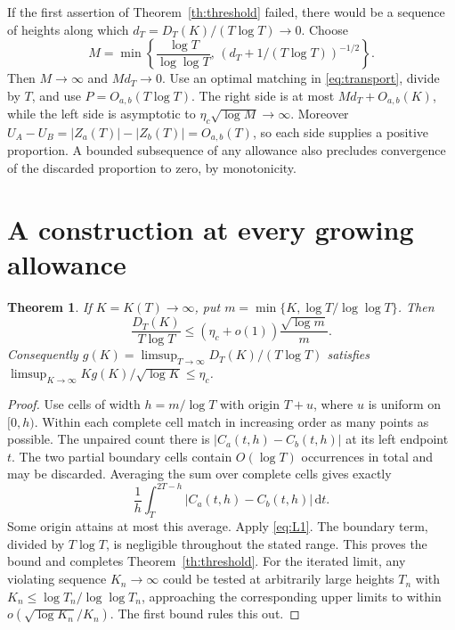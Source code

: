 \documentclass[11pt]{article}
\newtheorem{theorem}{Theorem}[section]
\newcommand{\dd}{\,\mathrm d}
\begin{document}
If the first assertion of Theorem~\ref{th:threshold} failed, there would be a
sequence of heights along which \(d_T=D_T(K)/(T\log T)\to0\).
Choose
\[
 M=\min\left\{\frac{\log T}{\log\log T},\,
                  (d_T+1/(T\log T))^{-1/2}\right\}.
\]
Then \(M\to\infty\) and \(Md_T\to0\). Use an optimal matching in
\eqref{eq:transport}, divide by \(T\), and use \(P=O_{a,b}(T\log T)\).
The right side is at most \(Md_T+O_{a,b}(K)\), while the left side is
asymptotic to \(\eta_c\sqrt{\log M}\to\infty\). Moreover
\(U_A-U_B=|Z_a(T)|-|Z_b(T)|=O_{a,b}(T)\), so each side supplies a positive
proportion. A bounded subsequence of any allowance also precludes convergence
of the discarded proportion to zero, by monotonicity.

\section{A construction at every growing allowance}

\begin{theorem}\label{th:upper}
If \(K=K(T)\to\infty\), put
\(m=\min\{K,\log T/\log\log T\}\). Then
\[
 \frac{D_T(K)}{T\log T}
 \le (\eta_c+o(1))\frac{\sqrt{\log m}}{m}.
\]
Consequently \(g(K)=\limsup_{T\to\infty}D_T(K)/(T\log T)\) satisfies
\(\limsup_{K\to\infty}K g(K)/\sqrt{\log K}\le\eta_c\).
\end{theorem}

\begin{proof}
Use cells of width \(h=m/\log T\) with origin \(T+u\), where
\(u\) is uniform on \([0,h)\). Within each complete cell match in increasing
order as many points as possible. The unpaired count there is
\(|C_a(t,h)-C_b(t,h)|\) at its left endpoint \(t\).
The two partial boundary cells contain \(O(\log T)\) occurrences in total and
may be discarded. Averaging the sum over complete cells gives exactly
\[
 \frac1h\int_T^{2T-h}|C_a(t,h)-C_b(t,h)|\dd t .
\]
Some origin attains at most this average. Apply \eqref{eq:L1}. The boundary
term, divided by \(T\log T\), is negligible throughout the stated range. This
proves the bound and completes Theorem~\ref{th:threshold}.
For the iterated limit, any violating sequence \(K_n\to\infty\) could be
tested at arbitrarily large heights \(T_n\) with
\(K_n\le\log T_n/\log\log T_n\), approaching the corresponding upper limits
to within \(o(\sqrt{\log K_n}/K_n)\). The first bound rules this out.
\end{proof}
\end{document}

